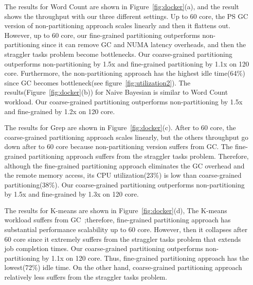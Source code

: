 The results for Word Count are shown in Figure~\ref{fig:docker}(a), and the
result shows the throughput with our three different settings.
Up to 60 core, the PS GC version of non-partitioning approach scales linearly and
then it flattens out.
However, up to 60 core, our fine-grained partitioning outperforms non-partitioning
since it can remove GC and NUMA latency overheads, and then the straggler tasks
problem become bottlenecks.
Our coarse-grained partitioning outperforms non-partitioning by 1.5x and
fine-grained partitioning by 1.1x on 120 core.
Furthermore, the non-partitioning approach has the highest idle time(64\%) since
GC becomes bottleneck(see figure~\ref{fig:utilization2}). 
The results(Figure~\ref{fig:docker}(b)) for Naive Bayesian is similar to Word Count
workload.
Our coarse-grained partitioning outperforms non-partitioning by 1.5x and fine-grained
by 1.2x on 120 core.


The results for Grep are shown in Figure~\ref{fig:docker}(c).
After to 60 core, the coarse-grained partitioning approach scales linearly, but
the others throughput go down after to 60 core because non-partitioning
version suffers from GC.
The fine-grained partitioning approach suffers from the straggler tasks problem.
Therefore, although the fine-grained partitioning approach eliminates the GC overhead and
the remote memory access, its CPU utilization(23\%) is low than coarse-grained partitioning(38\%).
Our coarse-grained partitioning outperforms non-partitioning by 1.5x and fine-grained
by 1.3x on 120 core.

The results for K-means are shown in Figure~\ref{fig:docker}(d),
The K-means workload suffers from GC~\cite{Ahsan2016SVS};therefore,
fine-grained partitioning approach has substantial performance scalability up to 60 core.
However, then it collapses after 60 core since it extremely suffers from the
straggler tasks problem that extends job completion times.
Our coarse-grained partitioning outperforms non-partitioning by 1.1x on 120 core.
Thus, fine-grained partitioning approach has the lowest(72\%) idle time.
On the other hand, coarse-grained partitioning approach relatively less suffers from the straggler
tasks problem.

